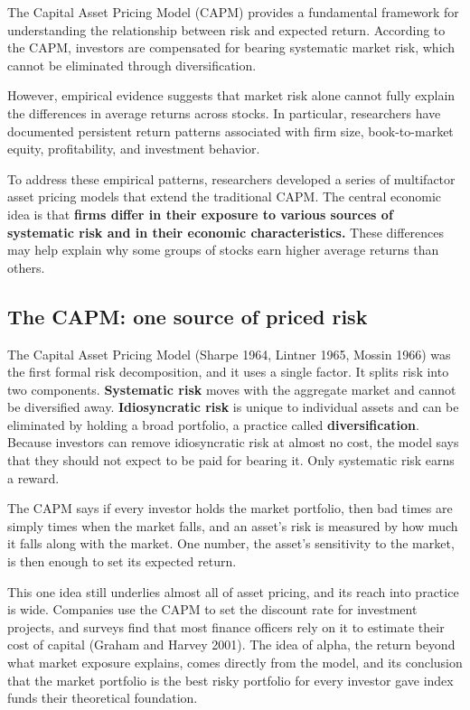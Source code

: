 The Capital Asset Pricing Model (CAPM) provides a fundamental framework for understanding the relationship between risk and expected return. According to the CAPM, investors are compensated for bearing systematic market risk, which cannot be eliminated through diversification. 

However, empirical evidence suggests that market risk alone cannot fully explain the differences in average returns across stocks. In particular, researchers have documented persistent return patterns associated with firm size, book-to-market equity, profitability, and investment behavior.

To address these empirical patterns, researchers developed a series of multifactor asset pricing models that extend the traditional CAPM. The central economic idea is that \textbf{firms differ in their exposure to various sources of systematic risk and in their economic characteristics.} These differences may help explain why some groups of stocks earn higher average returns than others.


\subsection{The CAPM: one source of priced risk}
\label{sec:03-capm}
The Capital Asset Pricing Model (Sharpe 1964, Lintner 1965, Mossin 1966) was the first formal risk decomposition, and it uses a single factor. It splits risk into two components. \textbf{Systematic risk} moves with the aggregate market and cannot be diversified away. \textbf{Idiosyncratic risk} is unique to individual assets and can be eliminated by holding a broad portfolio, a practice called \textbf{diversification}. Because investors can remove idiosyncratic risk at almost no cost, the model says that they should not expect to be paid for bearing it. Only systematic risk earns a reward.

The CAPM says if every investor holds the market portfolio, then bad times are simply times when the market falls, and an asset's risk is measured by how much it falls along with the market. One number, the asset's sensitivity to the market, is then enough to set its expected return.


This one idea still underlies almost all of asset pricing, and its reach into practice is wide. Companies use the CAPM to set the discount rate for investment projects, and surveys find that most finance officers rely on it to estimate their cost of capital (Graham and Harvey 2001). The idea of alpha, the return beyond what market exposure explains, comes directly from the model, and its conclusion that the market portfolio is the best risky portfolio for every investor gave index funds their theoretical foundation.

